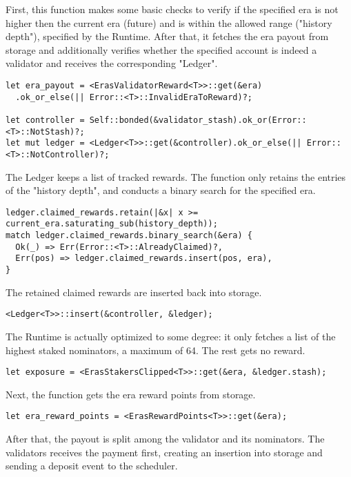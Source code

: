 \documentclass[11pt,a4paper]{article}
\begin{document}
First, this function makes some basic checks to verify if the specified era is not higher then the current era
(future) and is within the allowed range ("history depth"), specified by the Runtime.
After that, it fetches the era payout from storage
and additionally verifies whether the specified account is indeed a validator and receives the corresponding
"Ledger".

\begin{verbatim}
let era_payout = <ErasValidatorReward<T>>::get(&era)
  .ok_or_else(|| Error::<T>::InvalidEraToReward)?;

let controller = Self::bonded(&validator_stash).ok_or(Error::<T>::NotStash)?;
let mut ledger = <Ledger<T>>::get(&controller).ok_or_else(|| Error::<T>::NotController)?;
\end{verbatim}

The Ledger keeps a list of tracked rewards. The function only retains the entries of the "history depth",
and conducts a binary search for the specified era.

\begin{verbatim}
ledger.claimed_rewards.retain(|&x| x >= current_era.saturating_sub(history_depth));
match ledger.claimed_rewards.binary_search(&era) {
  Ok(_) => Err(Error::<T>::AlreadyClaimed)?,
  Err(pos) => ledger.claimed_rewards.insert(pos, era),
}
\end{verbatim}

The retained claimed rewards are inserted back into storage.

\begin{verbatim}
<Ledger<T>>::insert(&controller, &ledger);
\end{verbatim}

The Runtime is actually optimized to some degree: it only fetches a list of the highest staked nominators,
a maximum of 64. The rest gets no reward.

\begin{verbatim}
let exposure = <ErasStakersClipped<T>>::get(&era, &ledger.stash);
\end{verbatim}

Next, the function gets the era reward points from storage.

\begin{verbatim}
let era_reward_points = <ErasRewardPoints<T>>::get(&era);
\end{verbatim}

After that, the payout is split among the validator and its nominators. The validators receives the payment
first, creating an insertion into storage and sending a deposit event to the scheduler.
\end{document}
